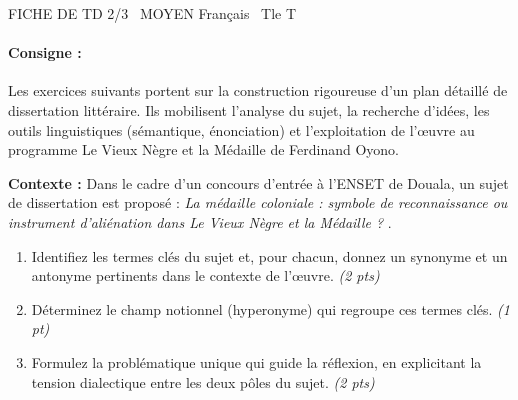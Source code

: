 \documentclass[11pt]{article}
\begin{document}
\begin{tcolorbox}[enhanced,colback=popink,colframe=popink,arc=10pt,boxrule=0pt,left=12pt,right=12pt,top=9pt,bottom=9pt]
{\color{white}\popxbold\small FICHE DE TD 2/3 \textbullet\ MOYEN \hfill Français \textbullet\ Tle T\par}
\end{tcolorbox}
\vspace{4pt}
\paragraph{Consigne :} Les exercices suivants portent sur la construction rigoureuse d'un plan détaillé de dissertation littéraire. Ils mobilisent l'analyse du sujet, la recherche d'idées, les outils linguistiques (sémantique, énonciation) et l'exploitation de l'œuvre au programme \og Le Vieux Nègre et la Médaille \fg{} de Ferdinand Oyono.

\begin{exercice}
\textbf{Contexte :} Dans le cadre d'un concours d'entrée à l'ENSET de Douala, un sujet de dissertation est proposé : \og \textit{La médaille coloniale : symbole de reconnaissance ou instrument d'aliénation dans \og Le Vieux Nègre et la Médaille \fg{} ?} \fg{}.
\begin{enumerate}
    \item Identifiez les termes clés du sujet et, pour chacun, donnez un synonyme et un antonyme pertinents dans le contexte de l'œuvre. \textit{(2 pts)}
    \item Déterminez le champ notionnel (hyperonyme) qui regroupe ces termes clés. \textit{(1 pt)}
    \item Formulez la problématique unique qui guide la réflexion, en explicitant la tension dialectique entre les deux pôles du sujet. \textit{(2 pts)}
\end{enumerate}
\end{exercice}
\end{document}

